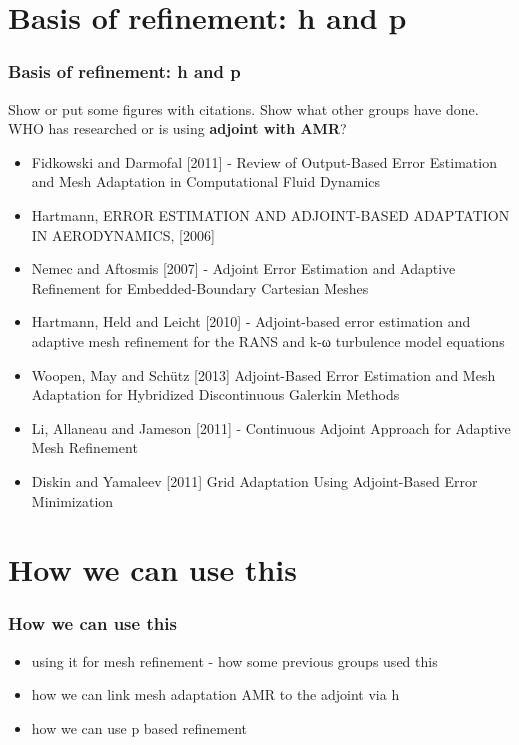 \documentclass{beamer}
\begin{document}
\section[Refinement]{Basis of refinement: h and p}
\begin{frame}%
\scriptsize
\frametitle{Basis of refinement: h and p}
Show or put some figures with citations. Show what other groups have done. WHO has researched or is using \textbf{adjoint with AMR}?
\begin{itemize}
\item Fidkowski and Darmofal [2011] - Review of Output-Based Error Estimation and Mesh Adaptation in Computational Fluid Dynamics
\item Hartmann, ERROR ESTIMATION AND ADJOINT-BASED ADAPTATION IN AERODYNAMICS, [2006]
\item Nemec and Aftosmis [2007] - Adjoint Error Estimation and Adaptive Refinement for Embedded-Boundary Cartesian Meshes
\item Hartmann, Held and Leicht [2010] - Adjoint-based error estimation and adaptive mesh refinement for the RANS and k-ω turbulence model equations
\item Woopen, May and Sch{\"u}tz [2013] Adjoint-Based Error Estimation and Mesh Adaptation for Hybridized Discontinuous Galerkin Methods
\item Li, Allaneau and Jameson [2011] - Continuous Adjoint Approach for Adaptive Mesh Refinement
\item Diskin and Yamaleev [2011] Grid Adaptation Using Adjoint-Based Error Minimization
\end{itemize}
\end{frame}


\section[Usage]{How we can use this}

\begin{frame}%
\frametitle{How we can use this}
\scriptsize
\begin{itemize}
\item using it for mesh refinement - how some previous groups used this
\item how we can link mesh adaptation AMR to the adjoint via h
\item how we can use p based refinement
\end{itemize}
\end{frame}
\end{document}
